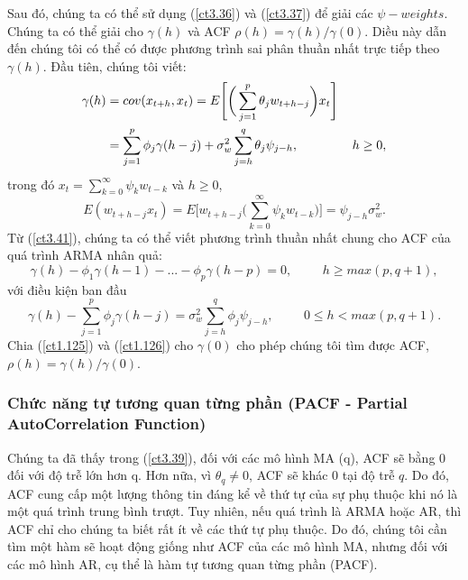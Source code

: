 \documentclass[12pt, a4paper,oneside]{book}
\theoremstyle{definition}
\begin{document}
Sau đó, chúng ta có thể sử dụng (\ref{ct3.36}) và (\ref{ct3.37}) để giải các $\psi-weights$. Chúng ta có thể giải cho $\gamma(h)$ và ACF $\rho(h)=\gamma(h)/\gamma(0)$. Diều này dẫn đến chúng tôi có thể có được phương trình sai phân thuần nhất trực tiếp theo $\gamma(h)$. Đầu tiên, chúng tôi viết:
\begin{align}
\gamma(h) & = cov (x_{t+h},x_{t}) = E\Bigg[\bigg(\displaystyle\sum_{j=1}^{p} \theta_{j}w_{t+h-j}\bigg)x_{t}\Bigg]\\
&  =\displaystyle\sum_{j=1}^{p}\phi_{j}\gamma(h-j)+\sigma_w^{2}\displaystyle\sum_{j=h}^{q}\theta_{j}\psi_{j-h}, \hspace{1.5cm} h \geq 0, \label{ct3.41}
\end{align}
trong đó $x_{t}=\sum_{k=0}^{\infty}\psi_{k}w_{t-k}$ và $h \geq 0$,
$$E(w_{t+h-j}x_{t})= E\Bigg[w_{t+h-j}\Big(\displaystyle\sum_{k=0}^{\infty}\psi_{k}w_{t-k}\Big)\Bigg] = \psi_{j-h}\sigma_w^{2}.$$ Từ (\ref{ct3.41}), chúng ta có thể viết phương trình thuần nhất chung cho ACF của quá trình ARMA nhân quả:
\begin{equation}
\gamma(h)-\phi_{1}\gamma(h-1)-...-\phi_{p}\gamma(h-p) = 0,\hspace{1cm} h \geq max(p, q +1), \label{ct1.125}
\end{equation} với điều kiện ban đầu
\begin{equation}
\gamma(h)-\displaystyle\sum_{j=1}^{p}\phi_{j}\gamma(h-j) = \sigma_w^{2}\displaystyle\sum_{j=h}^{q}\phi_{j}\psi_{j-h}, \hspace{1cm} 0 \leq h < max(p, q+1). \label{ct1.126}
\end{equation}
Chia (\ref{ct1.125}) và (\ref{ct1.126}) cho $\gamma(0)$ cho phép chúng tôi tìm được ACF, $\rho(h) = \gamma(h)/\gamma(0)$.
\subsubsection*{Chức năng tự tương quan từng phần (PACF - Partial AutoCorrelation Function)}
Chúng ta đã thấy trong (\ref{ct3.39}), đối với các mô hình MA (q), ACF sẽ bằng $0$ đối với độ trễ lớn hơn q. Hơn nữa, vì $\theta_q\neq0$, ACF sẽ khác $0$ tại độ trễ $q$. Do đó, ACF cung cấp một lượng thông tin đáng kể về thứ tự của sự phụ thuộc khi nó là một quá trình trung bình trượt. Tuy nhiên, nếu quá trình là ARMA hoặc AR, thì ACF chỉ cho chúng ta biết rất ít về các thứ tự phụ thuộc. Do đó, chúng tôi cần tìm một hàm sẽ hoạt động giống như ACF của các mô hình MA, nhưng đối với các mô hình AR, cụ thể là hàm tự tương quan từng phần (PACF).
\end{document}
